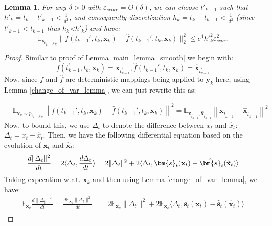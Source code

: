 \documentclass[11pt]{article}
\def\rvx{{\mathbf{x}}}
\def\rvy{{\mathbf{y}}}
\def\vs{{\bm{s}}}
\def\vx{{\bm{x}}}
\newcommand{\E}{\mathbb{E}}
\newtheorem{lemma}{Lemma}[section]
\begin{document}
\begin{lemma}
\label{main_lemma_non_smooth}
   For any $\delta>0$ with $\varepsilon_{score} = O(\delta)$, we can choose $t'_{k-1}$ such that $h'_k=t_{k}-t'_{k-1}  < \frac{1}{d^2}$, and consequently discretization 
$h_{k} = t_{k}-t_{k-1} < \frac{1}{d^2}$ (since $t'_{k-1}<t_{k-1}$ thus $h_k$<$h'_k$) and have:
\[
  \E_{p_{t_1,...,t_K}}  
  \|
  f(t_{k-1}',t_k,{\rvx}_k)-\hat{f}(t_{k-1}',t_k,{\rvx}_k)\|_2^2  \leq e^4{h'}_k^2\varepsilon^2_{score} 
\]
\end{lemma}
\begin{proof}
Similar to proof of Lemma \ref{main_lemma_smooth} we begin with:
\begin{equation*}
    f(t_{k-1}^\prime, t_k, \rvx_k) = \vx_{t_{k-1}^\prime},  \hat{f}(t_{k-1}',t_k,{\rvx}_k) = \hat{\vx}_{t^\prime_{k-1}}
\end{equation*}
Now, since $f$ and $\hat{f}$ are deterministic mappings being applied to $\rvy_k$ here, using {Lemma \ref{change_of_var_lemma}}, we can just rewrite this as:

\begin{equation*}
    \begin{aligned}
        &\E_{\rvx_k \sim {p}_{t_1,.., t_{K}}}\left\|f(t_{k-1}',t_k,{\rvx}_k)-\hat{f}(t_{k-1}',t_k,{\rvx}_k)\right\|^2 = \E_{\rvx_{t^\prime_{k-1}}, \hat{\rvx}_{t^\prime_{k-1}}}\left\|\rvx_{t^\prime_{k-1}} - \hat{\rvx}_{t^\prime_{k-1}} \right\|^2 
    \end{aligned}
\end{equation*}
Now, to bound this, we use $\Delta_t$ to denote the difference between $x_t$ and $\hat{x}_t$: $\Delta_t=x_t-\hat{x}_t$. Then, we have the following differential equation based on the evolution of $\rvx_t$ and $\hat{\rvx}_t$:
\[
\frac{d \|\Delta_t\|^2}{dt} = 2\langle\Delta_t, \frac{d \Delta_t}{dt}\rangle = 2\|\Delta_t\|^2 + 2\langle\Delta_t,\vs_t(\rvx_t)-\hat{\vs}_t(\hat{\rvx}_t)\rangle \\
\]
Taking expecation w.r.t. $\rvx_k$ and then using Lemma \ref{change_of_var_lemma}, we have:
\begin{equation*}
\begin{aligned}
\mathbb{E}_{\rvx_k} \frac{d \|\Delta_t\|^2}{dt}  = \frac{d \mathbb{E}_{\rvx_k}\|\Delta_t\|^2}{dt}  &= 2\mathbb{E}_{\rvx_k}\|\Delta_t\|^2 + 2\mathbb{E}_{\rvx_k}\langle\Delta_t,\vs_t(\rvx_t)-\hat{\vs}_t(\hat{\rvx}_t)\rangle \\
    \end{aligned}
\end{equation*}



\end{proof}
\end{document}
